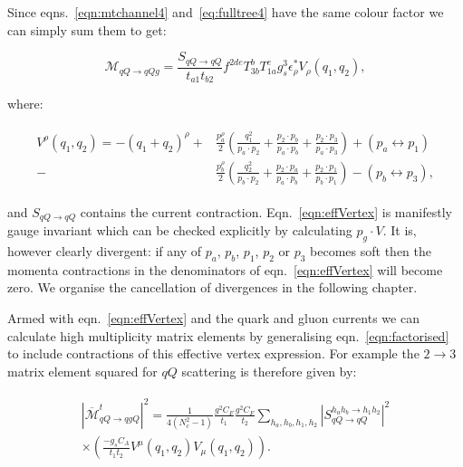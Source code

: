 	Since eqns.~\eqref{eqn:mtchannel4} and~\eqref{eq:fulltree4} have the same colour factor we can simply sum
	them to get:

	\begin{equation}
		\mathcal{M}_{qQ\rightarrow qQg} = \frac{S_{qQ\rightarrow qQ}}{t_{a1}t_{b2}}
		f^{2de}T^b_{3b}T^e_{1a}g_s^3\epsilon^*_\rho V_\rho(q_1, q_2),
	\end{equation}

	where:

	\begin{align}
	\begin{split}
		V^\rho(q_1, q_2) = -(q_1 + q_2)^\rho +
		&\frac{p_a^\rho}{2}\left(\frac{q^2_1}{p_a\cdot p_2} + \frac{p_2 \cdot p_b}{p_a \cdot p_b} +
		\frac{p_2 \cdot p_3}{p_a \cdot p_3}\right) + (p_a\leftrightarrow p_1) \\
		- &\frac{p_b^\rho}{2}\left(\frac{q^2_2}{p_b\cdot p_2} + \frac{p_2 \cdot p_a}{p_a \cdot p_b} +
		\frac{p_2 \cdot p_1}{p_b \cdot p_1}\right) - (p_b\leftrightarrow p_3),
		\label{eqn:effVertex}
	\end{split}
	\end{align}

	and $S_{qQ\rightarrow qQ}$ contains the current contraction.  Eqn.~\eqref{eqn:effVertex} is manifestly gauge invariant which can be checked explicitly by
	calculating $p_g\cdot V$.  It is, however clearly divergent:  if any of $p_a$, $p_b$, $p_1$,
	$p_2$ or $p_3$ becomes soft then the momenta contractions in the denominators of
	eqn.~\eqref{eqn:effVertex} will become zero.  We organise the cancellation of divergences in
	the following chapter.

	Armed with eqn.~\eqref{eqn:effVertex} and the quark and gluon currents we can calculate
	high multiplicity matrix elements by generalising eqn.~\eqref{eqn:factorised} to include
	contractions of this effective vertex expression.  For example the $2\rightarrow3$ matrix element
	squared for $qQ$ scattering is therefore given by:

	\begin{align}
	\begin{split}
		|\overline{\mathcal{M}}^t_{qQ\rightarrow qgQ}|^2 = \frac{1}{4(N_c^2-1)}
		\frac{g^2C_F}{t_1}\frac{g^2C_F}{t_2} \sum_{h_a, h_b, h_1, h_2}
		|S_{qQ\rightarrow qQ}^{h_ah_b\rightarrow h_1h_2}|^2\\
		\times\left(\frac{-g_sC_A}{t_1t_{2}}V^\mu(q_1, q_{2})V_\mu(q_1, q_{2})\right).
		\label{eqn:factorised2To3}
	\end{split}
	\end{align}

